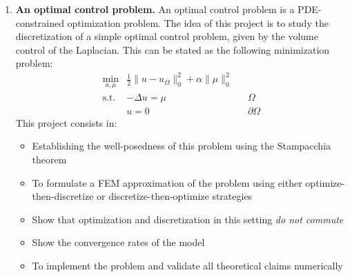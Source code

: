 \documentclass{article}
\begin{document}
\begin{enumerate}
    \item \textbf{An optimal control problem.} An optimal control problem is a PDE-constrained optimization problem. The idea of this project is to study the discretization of a simple optimal control problem, given by the volume control of the Laplacian. This can be stated as the following minimization problem: 
        $$ \begin{aligned} \min_{u,\mu} &\frac 1 2 \|u - u_\Omega\|_0^2 + \alpha \|\mu\|_0^2 && \\
            \text{s.t.} & -\Delta u = \mu &&  \Omega \\
                        & u = 0 && \partial\Omega
        \end{aligned} $$
        This project consists in:
        \begin{itemize}
            \item Establishing the well-posedness of this problem using the Stampacchia theorem
            \item To formulate a FEM approximation of the problem using either optimize-then-discretize or discretize-then-optimize strategies
            \item Show that optimization and discretization in this setting \emph{do not commute}
            \item Show the convergence rates of the model
            \item To implement the problem and validate all theoretical claims numerically
        \end{itemize}
\end{enumerate}

\end{document}
